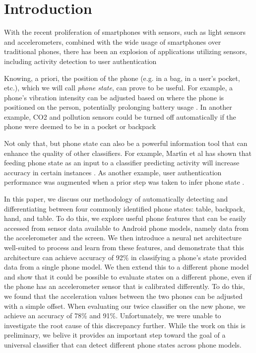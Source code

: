 \section{Introduction}
With the recent proliferation of smartphones with sensors, such as light sensors and accelerometers,
 combined with the wide usage of smartphones over traditional phones, 
 there has been an explosion of applications utilizing sensors,
 including activity detection \cite{Martin2013} to user authentication \cite{Kumar17,Primo14}

Knowing, a priori, the position of the phone (e.g. in a bag, in a user's pocket, etc.), 
 which we will call \textit{phone state}, can prove to be useful.
For example, a phone's vibration intensity can be adjusted based on where the phone is positioned on the person, potentially prolonging battery usage \cite{Fujinami2013}.
In another example, CO2 and pollution sensors could be turned off automatically if the phone were deemed to be in a pocket or backpack \cite{Miluzzo2010} 

Not only that, but phone state can also be a powerful information tool that can enhance the quality of other classifiers.
For example, Mart\'{\i}n et al has shown that feeding phone state as an input to a classifier predicting activity will increase accuracy in certain instances \cite{Martin2013}.  
As another example, user authentication performance was augmented when a prior step was taken to infer phone state \cite{Primo14}.


In this paper, we discuss our methodology of automatically detecting and differentiating between four commonly identified phone states: table, backpack, hand, and table. 
To do this, we explore useful phone features that can be easily accessed from sensor data available to Android phone models, namely data from the accelerometer and the screen.
We then introduce a neural net architecture well-suited to process and learn from these features, 
and demonstrate that this architecture can achieve accuracy of 92\% in classifying a phone’s state provided data from a single phone model.
We then extend this to a different phone model and show that it could be possible to evaluate states on a 
 different phone, even if the phone has an accelerometer sensor that is calibrated differently.
To do this, we found that the acceleration values between the two phones can be adjusted with a simple offset.
When evaluating our twice classifier on the new phone, we achieve an accuracy of 78\% and 91\%.
Unfortunately, we were unable to investigate the root cause of this discrepancy further. 
While the work on this is preliminary, we belive it provides an important step toward the goal of a 
universal classifier that can detect different phone states across phone models. 

